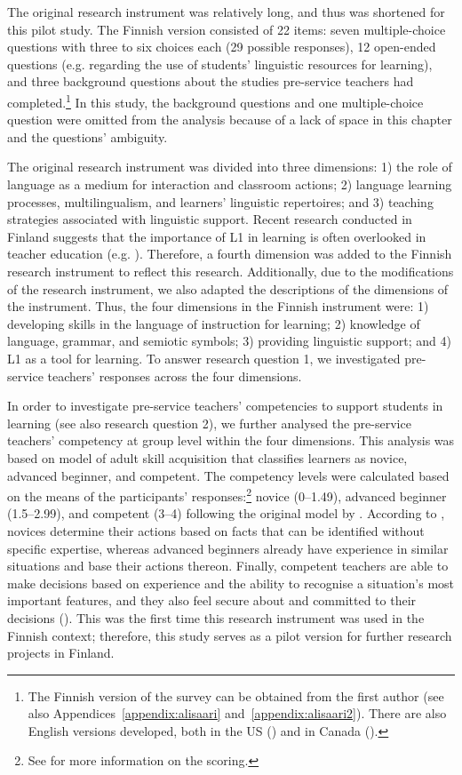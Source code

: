 \documentclass[output=paper]{langscibook}
\begin{document}
The original research instrument was relatively long, and thus was shortened for this pilot study. The Finnish version consisted of 22 items: seven multiple-choice questions with three to six choices each (29 possible responses), 12 open-ended questions (e.g. regarding the use of students’ linguistic resources for learning), and three background questions about the studies pre-service teachers had completed.\footnote{The Finnish version of the survey can be obtained from the first author (see also Appendices~\ref{appendix:alisaari} and~\ref{appendix:alisaari2}). There are also English versions developed, both in the US (\citealt{HammerViesca2023}) and in Canada (\citealt{Bale2023}).} In this study, the background questions and one multiple-choice question were omitted from the analysis because of a lack of space in this chapter and the questions’ ambiguity.

The original research instrument was divided into three dimensions: 1) the role of language as a medium for interaction and classroom actions; 2) language learning processes, multilingualism, and learners’ linguistic repertoires; and 3) teaching strategies associated with linguistic support. Recent research conducted in Finland suggests that the importance of L1 in learning is often overlooked in teacher education (e.g. \citealt{AlisaariEtAl2019,HeikkolaEtAl2022,Repo2020}). Therefore, a fourth dimension was added to the Finnish research instrument to reflect this research. Additionally, due to the modifications of the research instrument, we also adapted the descriptions of the dimensions of the instrument. Thus, the four dimensions in the Finnish instrument were: 1) developing skills in the language of instruction for learning; 2) knowledge of language, grammar, and semiotic symbols; 3) providing linguistic support; and 4) L1 as a tool for learning. To answer research question 1, we investigated pre-service teachers’ responses across the four dimensions.

In order to investigate pre-service teachers’ competencies to support students in learning (see also research question 2), we further analysed the pre-service teachers’ competency at group level within the four dimensions. This analysis was based on  model of adult skill acquisition that classifies learners as novice, advanced beginner, and competent. The competency levels were calculated based on the means of the participants’ responses:\footnote{See  for more information on the scoring.} novice (0–1.49), advanced beginner (1.5–2.99), and competent (3–4) following the original model by \citet{CarlsonEtAl2018}. According to \citet{DreyfusDreyfus1986}, novices determine their actions based on facts that can be identified without specific expertise, whereas advanced beginners already have experience in similar situations and base their actions thereon. Finally, competent teachers are able to make decisions based on experience and the ability to recognise a situation’s most important features, and they also feel secure about and committed to their decisions (\citealt{DreyfusDreyfus1986}). This was the first time this research instrument was used in the Finnish context; therefore, this study serves as a pilot version for further research projects in Finland.
\end{document}
